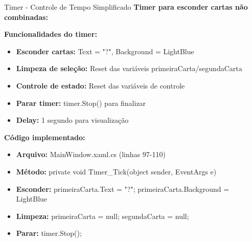\documentclass[aspectratio=169]{beamer}
\begin{document}
\begin{frame}{Timer - Controle de Tempo Simplificado}
\textbf{Timer para esconder cartas não combinadas:}

\textbf{Funcionalidades do timer:}
\begin{itemize}
    \item \textbf{Esconder cartas:} Text = "?", Background = LightBlue
    \item \textbf{Limpeza de seleção:} Reset das variáveis primeiraCarta/segundaCarta
    \item \textbf{Controle de estado:} Reset das variáveis de controle
    \item \textbf{Parar timer:} timer.Stop() para finalizar
    \item \textbf{Delay:} 1 segundo para visualização
\end{itemize}

\textbf{Código implementado:}
\begin{itemize}
    \item \textbf{Arquivo:} MainWindow.xaml.cs (linhas 97-110)
    \item \textbf{Método:} private void Timer\_Tick(object sender, EventArgs e)
    \item \textbf{Esconder:} primeiraCarta.Text = "?"; primeiraCarta.Background = LightBlue
    \item \textbf{Limpeza:} primeiraCarta = null; segundaCarta = null;
    \item \textbf{Parar:} timer.Stop();
\end{itemize}
\end{frame}
\end{document}
